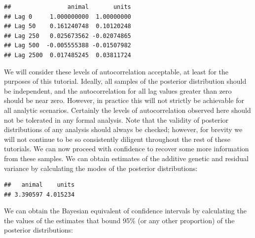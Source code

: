 \documentclass[
  12pt,
]{book}
\newenvironment{Shaded}{\begin{snugshade}}{\end{snugshade}}
\newcommand{\FloatTok}[1]{\textcolor[rgb]{0.00,0.00,0.81}{#1}}
\newcommand{\KeywordTok}[1]{\textcolor[rgb]{0.13,0.29,0.53}{\textbf{#1}}}
\newcommand{\NormalTok}[1]{#1}
\newcommand{\OperatorTok}[1]{\textcolor[rgb]{0.81,0.36,0.00}{\textbf{#1}}}
\begin{document}
\begin{Shaded}
\end{Shaded}

\begin{verbatim}
##                animal       units
## Lag 0     1.000000000  1.00000000
## Lag 50    0.161240748  0.10120248
## Lag 250   0.025673562 -0.02074865
## Lag 500  -0.005555388 -0.01507982
## Lag 2500  0.017485245  0.03811724
\end{verbatim}

We will consider these levels of autocorrelation acceptable, at least for the purposes of this tutorial. Ideally, all samples of the posterior distribution should be independent, and the autocorrelation for all lag values greater than zero should be near zero. However, in practice this will not strictly be achievable for all analytic scenarios. Certainly the levels of autocorrelation observed here should not be tolerated in any formal analysis.
Note that the validity of posterior distributions of any analysis should always be checked; however, for brevity we will not continue to be so consistently diligent throughout the rest of these tutorials. We can now proceed with confidence to recover some more information from these samples. We can obtain estimates of the additive genetic and residual variance by calculating the modes of the posterior distributions:

\begin{Shaded}
\end{Shaded}

\begin{verbatim}
##   animal    units 
## 3.390597 4.015234
\end{verbatim}

We can obtain the Bayesian equivalent of confidence intervals by calculating the the values of the estimates that bound 95\% (or any other proportion) of the posterior distributions:

\begin{Shaded}
\end{Shaded}
\end{document}

